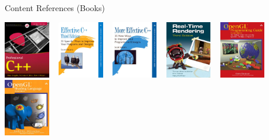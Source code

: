 \begin{frame}{Content References (Books)}

	\center
	
	\includegraphics[width=0.15\textwidth]{books/profcpp}
	~
	\includegraphics[width=0.15\textwidth]{books/effective}
	~
	\includegraphics[width=0.15\textwidth]{books/moreeffective}
	~
	\includegraphics[width=0.15\textwidth]{books/realtime}
	~
	\includegraphics[width=0.15\textwidth]{books/red}
	~
	\includegraphics[width=0.15\textwidth]{books/orange}
	
	\medskip


\end{frame}
